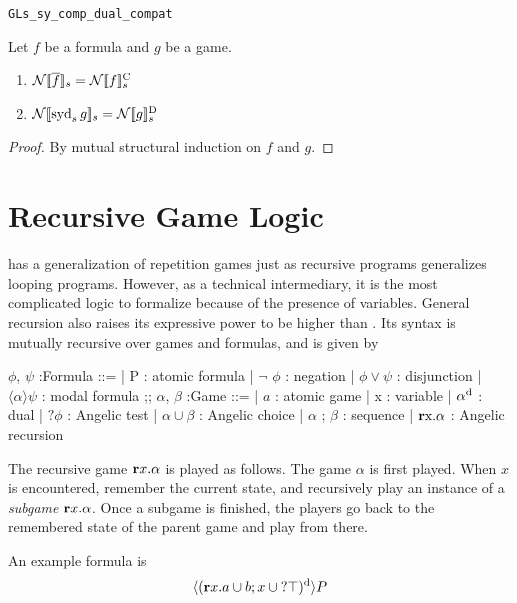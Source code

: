 \begin{blemma}
\texttt{GLs\_sy\_comp\_dual\_compat}

Let $f$ be a \GLs{} formula and $g$ be a \GLs{} game.

\begin{enumerate}
    \item $\mathcal N[\![ \overline f]\!]_s = \mathcal N[\![ f]\!]_s^\text{C} $ \\
    \item $\mathcal N[\![ \operatorname{syd}_s g]\!]_s = \mathcal N[\![ g]\!]_s^\text{D} $
\end{enumerate}
\end{blemma}
\begin{proof}
    By mutual structural induction on $f$ and $g$.
\end{proof}

\section{Recursive Game Logic}
\RGL{} has a generalization of repetition games just as recursive programs generalizes looping programs. However, as a technical intermediary, it is the most complicated logic to formalize because of the presence of variables. General recursion also raises its expressive power to be higher than \GL{}. Its syntax is mutually recursive over games and formulas, and is given by 
\begin{center}
    \begin {bnf}
        $\phi$, $\psi$ :\textsf{Formula} ::=
        | P : atomic formula
        | $\neg$ $\phi$ : negation
        | $\phi \vee\psi$ : disjunction
        | $\langle\alpha\rangle \psi$ : modal formula
        ;;
        $\alpha$, $\beta$ :\textsf{Game} ::=
        | $a$ : atomic game
        | x : variable
        | $\alpha^\text{d}$ : dual
        | $?\phi$ : Angelic test
        | $\alpha\cup\beta$ : Angelic choice
        | $\alpha$ ; $\beta$ : sequence
        | $\textbf{r}\text{x}. \alpha$ : Angelic recursion
    \end{bnf}
\end{center}
The recursive game $\textbf{r} x.\alpha$ is played as follows. The game $\alpha$ is first played. When $x$ is encountered, remember the current state, and recursively play an instance of a \textit{subgame} $\textbf{r} x. \alpha$. Once a subgame is finished, the players go back to the remembered state of the parent game and play from there.

\begin{example}
\label{ex:rgl_notnormal}
    An example \RGL{} formula is 
    \begin{equation}
        \label{eqn:example_rgl}
            \langle(\textbf{r} x. a\cup b; x \cup \text{?} \top )^\text{d}\rangle P
    \end{equation}
\end{example}

